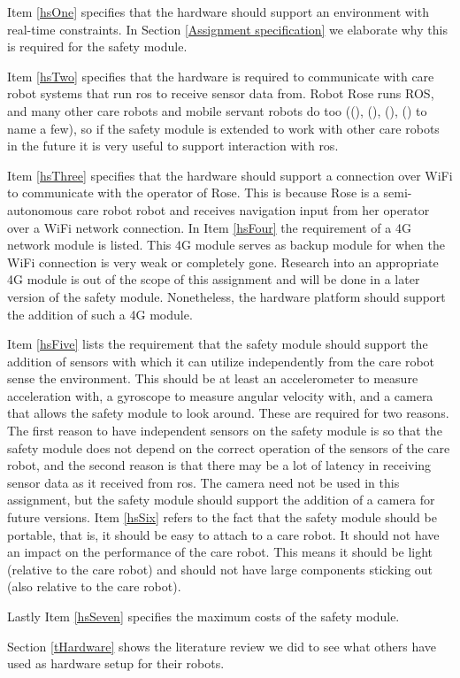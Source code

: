 \documentclass[12pt]{scrreprt}
\begin{document}
Item \ref{hsOne} specifies that the hardware should support an environment with real-time constraints. In Section \ref{Assignment specification} we elaborate why this is required for the safety module.
\par
Item \ref{hsTwo} specifies that the hardware is required to communicate with care robot systems that run \acrlong{ros} to receive sensor data from. Robot Rose runs ROS, and many other care robots and mobile servant robots do too ((\cite{human-robot}), (\cite{spencer}), (\cite{delgado}), (\cite{dimitris}) to name a few), so if the safety module is extended to work with other care robots in the future it is very useful to support interaction with \acrshort{ros}. 
\par
Item \ref{hsThree} specifies that the hardware should support a connection over WiFi to communicate with the operator of Rose. This is because Rose is a semi-autonomous care robot robot and receives navigation input from her operator over a WiFi network connection. In Item \ref{hsFour} the requirement of a 4G network module is listed. This 4G module serves as backup module for when the WiFi connection is very weak or completely gone. Research into an appropriate 4G module is out of the scope of this assignment and will be done in a later version of the safety module. Nonetheless, the hardware platform should support the addition of such a 4G module.
\par
Item \ref{hsFive} lists the requirement that the safety module should support the addition of sensors with which it can utilize independently from the care robot sense the environment. This should be at least an accelerometer to measure acceleration with, a gyroscope to measure angular velocity with, and a camera that allows the safety module to look around. These are required for two reasons. The first reason to have independent sensors on the safety module is so that the safety module does not depend on the correct operation of the sensors of the care robot, and the second reason is that there may be a lot of latency in receiving sensor data as it received from \acrshort{ros}. The camera need not be used in this assignment, but the safety module should support the addition of a camera for future versions. 
Item \ref{hsSix} refers to the fact that the safety module should be portable, that is, it should be easy to attach to a care robot. It should not have an impact on the performance of the care robot. This means it should be light (relative to the care robot) and should not have large components sticking out (also relative to the care robot).
\par
Lastly Item \ref{hsSeven} specifies the maximum costs of the safety module.
\par
Section \ref{tHardware} shows the literature review we did to see what others have used as hardware setup for their robots.
\end{document}
